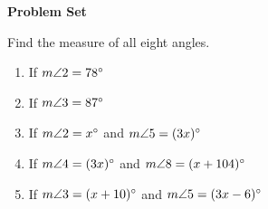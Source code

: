 \def\figdir{/storage/emulated/0/Documents/documents/latex/1920/Grade-8/3rd/properties-of-parallel-lines-cut-by-a-transversal/f}


\textbf{Problem Set}

\vspce

Find the measure of all eight angles. 
\begin{enumerate}[label = \arabic*. ]
\item \hspce If $m\angle{2} = 78 \degree $
\item \hspce If $m\angle{3} = 87 \degree $
\item \hspce If $m\angle{2} = x \degree $ and $m\angle{5} = (3x)  \degree $
\item \hspce If $m\angle{4} = (3x)\degree $ and $m\angle{8} = (x+104)  \degree $
\item \hspce If $m\angle{3} = (x+10) \degree $ and $m\angle{5} = (3x-6)  \degree $
\hspace*{12ex}\vspace*{-12ex}
\vspace*{10ex}
\end{enumerate}  

%
